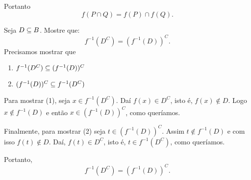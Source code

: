 \documentclass[12pt]{exam}
\begin{document}
    Portanto
    \[
        f(P \cap Q) = f(P) \cap f(Q).
    \]

    \vspace{.4cm}

    \questao Seja $D \subseteq B$. Mostre que:
    \[
        f^{-1}(D^C) = (f^{-1}(D))^C.
    \]
    \noindent\solucao Precisamos mostrar que
    \begin{enumerate}
        \item $f^{-1}(D^C) \subseteq (f^{-1}(D))^C$
        \item $(f^{-1}(D))^C \subseteq f^{-1}(D^C)$
    \end{enumerate}

    Para mostrar (1), seja $x \in f^{-1}(D^C)$. Daí $f(x) \in D^C$, isto é, $f(x) \notin D$.
    Logo $x \notin f^{-1}(D)$ e então $x \in (f^{-1}(D))^C$, como queríamos.

    Finalmente, para mostrar (2) seja $t \in (f^{-1}(D))^C$. Assim $t \notin f^{-1}(D)$ e com isso
    $f(t) \notin D$. Daí, $f(t) \in D^C$, isto é, $t \in f^{-1}(D^C)$, como queríamos.

    Portanto,
    \[
        f^{-1}(D^C) = (f^{-1}(D))^C.
    \]

    \vspace{1cm}
\end{document}
